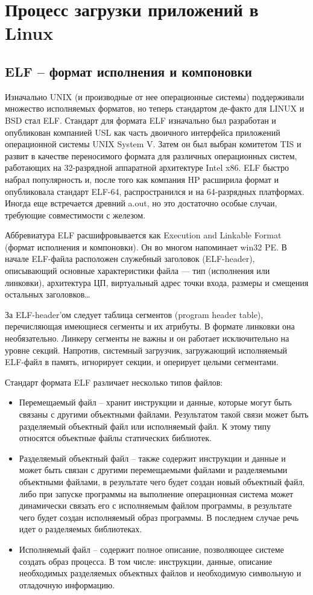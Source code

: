 \newpage
\section{Процесс загрузки приложений в Linux}

\subsection{ELF -- формат исполнения и компоновки}

Изначально UNIX (и производные от нее операционные системы) поддерживали множество исполняемых форматов, но теперь стандартом де-факто для LINUX и BSD стал ELF. Стандарт для формата ELF изначально был разработан и опубликован компанией USL как часть двоичного интерфейса приложений операционной системы UNIX System V. Затем он был выбран комитетом TIS и развит в качестве переносимого формата для различных операционных систем, работающих на 32-разрядной аппаратной архитектуре Intel x86. ELF быстро набрал популярность и, после того как компания HP расширила формат и опубликовала стандарт ELF-64, распространился и на 64-разрядных платформах. Иногда еще встречается древний a.out, но это достаточно особые случаи, требующие совместимости с железом.

Аббревиатура ELF расшифровывается как Execution and Linkable Format (формат исполнения и компоновки). Он во многом напоминает win32 PE. В начале ELF-файла расположен служебный заголовок (ELF-header), описывающий основные характеристики файла — тип (исполнения или линковки), архитектура ЦП, виртуальный адрес точки входа, размеры и смещения остальных заголовков…

За ELF-header'ом следует таблица сегментов (program header table), перечисляющая имеющиеся сегменты и их атрибуты. В формате линковки она необязательно. Линкеру сегменты не важны и он работает исключительно на уровне секций. Напротив, системный загрузчик, загружающий исполняемый ELF-файл в память, игнорирует секции, и оперирует целыми сегментами\cite{Cit1}.

Стандарт формата ELF различает несколько типов файлов:
\begin{itemize}
\item Перемещаемый файл -- хранит инструкции и данные, которые могут быть связаны с другими объектными файлами. Результатом такой связи может быть разделяемый объектный файл или исполняемый файл. К этому типу относятся объектные файлы статических библиотек.
\item Разделяемый объектный файл -- также содержит инструкции и данные и может быть связан с другими перемещаемыми файлами и разделяемыми объектными файлами, в результате чего будет создан новый объектный файл, либо при запуске программы на выполнение операционная система может динамически связать его с исполняемым файлом программы, в результате чего будет создан исполняемый образ программы. В последнем случае речь идет о разделяемых библиотеках.
\item Исполняемый файл -- содержит полное описание, позволяющее системе создать образ процесса. В том числе: инструкции, данные, описание необходимых разделяемых объектных файлов и необходимую символьную и отладочную информацию.
\end{itemize}

